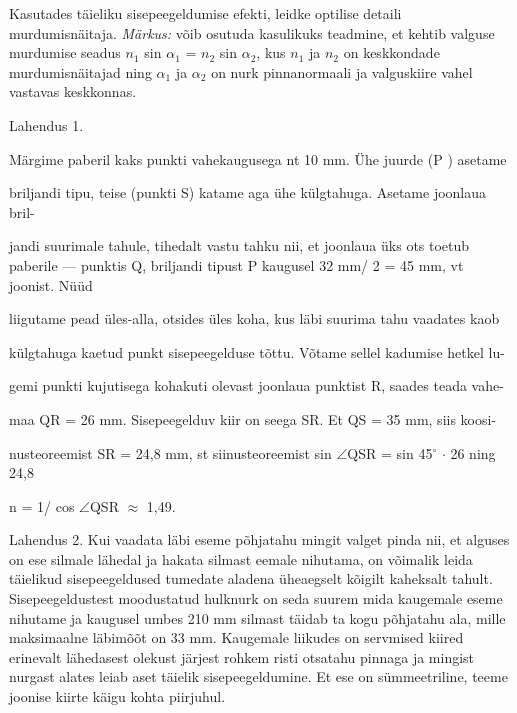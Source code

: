 
Kasutades täieliku sisepeegeldumise efekti, leidke optilise detaili murdumisnäitaja.
\textit{Märkus:} võib osutuda kasulikuks teadmine, et kehtib valguse murdumise seadus $n_1$ sin $\alpha_1$ = $n_2$ sin $\alpha_2$, kus $n_1$ ja $n_2$ on keskkondade murdumisnäitajad ning $\alpha_1$ ja $\alpha_2$ on nurk pinnanormaali ja valguskiire vahel vastavas keskkonnas.

\hint

\solu
Lahendus 1.

Märgime paberil kaks punkti vahekaugusega nt 10 mm. Ühe juurde (P ) asetame

briljandi tipu, teise (punkti S) katame aga ühe külgtahuga. Asetame joonlaua bril-

jandi suurimale tahule, tihedalt vastu tahku nii, et joonlaua üks ots toetub paberile --- punktis Q, briljandi tipust P kaugusel 32 mm/ 2 = 45 mm, vt joonist. Nüüd

liigutame pead üles-alla, otsides üles koha, kus läbi suurima tahu vaadates kaob

külgtahuga kaetud punkt sisepeegelduse tõttu. Võtame sellel kadumise hetkel lu-

gemi punkti kujutisega kohakuti olevast joonlaua punktist R, saades teada vahe-

maa QR = 26 mm. Sisepeegelduv kiir on seega SR. Et QS = 35 mm, siis koosi-

nusteoreemist SR = 24,8 mm, st siinusteoreemist sin $\angle$QSR = sin 45$^\circ$ $\cdot$ 26 ning 24,8

n = 1/ cos $\angle$QSR $\approx$ 1,49.

Lahendus 2. Kui vaadata läbi eseme põhjatahu mingit valget pinda nii, et alguses on ese silmale lähedal ja hakata silmast eemale nihutama, on võimalik leida täielikud sisepeegeldused tumedate aladena üheaegselt kõigilt kaheksalt tahult. Sisepeegeldustest moodustatud hulknurk on seda suurem mida kaugemale eseme nihutame ja kaugusel umbes 210 mm silmast täidab ta kogu põhjatahu ala, mille maksimaalne läbimõõt on 33 mm. Kaugemale liikudes on servmised kiired erinevalt lähedasest olekust järjest rohkem risti otsatahu pinnaga ja mingist nurgast alates leiab aset täielik sisepeegeldumine. Et ese on sümmeetriline, teeme joonise kiirte käigu kohta piirjuhul.

